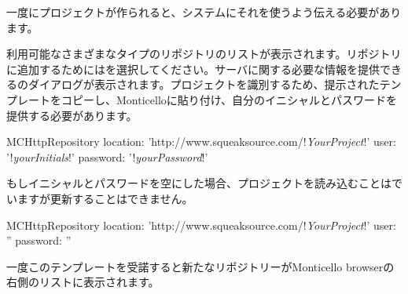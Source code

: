 \documentclass[a4paper,10pt,twoside]{book}
\begin{document}
一度\sqsrc にプロジェクトが作られると、\pharo システムにそれを使うよう伝える必要があります。

  利用可能なさまざまなタイプのリポジトリのリストが表示されます。\sqsrc リポジトリに追加するためにはを選択してください。サーバに関する必要な情報を提供できるのダイアログが表示されます。\sqsrc プロジェクトを識別するため、提示されたテンプレートをコピーし、Monticelloに貼り付け、自分のイニシャルとパスワードを提供する必要があります。 

\begin{code}{}
MCHttpRepository 
    location: 'http://www.squeaksource.com/!\emph{YourProject}!'
    user: '!\emph{yourInitials}!' 
    password: '!\emph{yourPassword}!'
\end{code}   

\noindent
もしイニシャルとパスワードを空にした場合、プロジェクトを読み込むことはでいますが更新することはできません。

\begin{code}{}
MCHttpRepository 
    location: 'http://www.squeaksource.com/!\emph{YourProject}!'
    user: '' 
    password: ''
\end{code}   

一度このテンプレートを受諾すると新たなリポジトリーがMonticello browserの右側のリストに表示されます。
\end{document}
